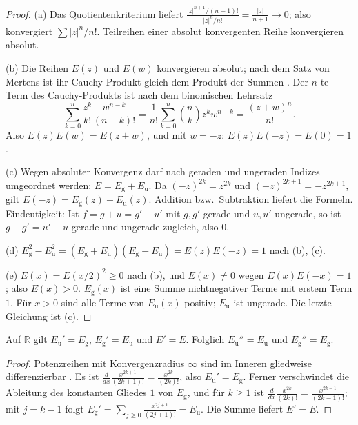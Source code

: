 \begin{proof}
(a) Das Quotientenkriterium liefert $\frac{|z|^{n+1}/(n+1)!}{|z|^n/n!}=\frac{|z|}{n+1}\to0$; also konvergiert $\sum|z|^n/n!$. Teilreihen einer absolut konvergenten Reihe konvergieren absolut.

(b) Die Reihen $E(z)$ und $E(w)$ konvergieren absolut; nach dem Satz von Mertens ist ihr Cauchy-Produkt gleich dem Produkt der Summen \cite{rudin_analysis}. Der $n$-te Term des Cauchy-Produkts ist nach dem binomischen Lehrsatz
\[
\sum_{k=0}^{n}\frac{z^k}{k!}\frac{w^{n-k}}{(n-k)!}=\frac1{n!}\sum_{k=0}^n\binom nk z^kw^{n-k}=\frac{(z+w)^n}{n!}.
\]
Also $E(z)E(w)=E(z+w)$, und mit $w=-z$: $E(z)E(-z)=E(0)=1$.

(c) Wegen absoluter Konvergenz darf nach geraden und ungeraden Indizes umgeordnet werden: $E=E_{\mathrm g}+E_{\mathrm u}$. Da $(-z)^{2k}=z^{2k}$ und $(-z)^{2k+1}=-z^{2k+1}$, gilt $E(-z)=E_{\mathrm g}(z)-E_{\mathrm u}(z)$. Addition bzw.\ Subtraktion liefert die Formeln. Eindeutigkeit: Ist $f=g+u=g'+u'$ mit $g,g'$ gerade und $u,u'$ ungerade, so ist $g-g'=u'-u$ gerade und ungerade zugleich, also $0$.

(d) $E_{\mathrm g}^2-E_{\mathrm u}^2=(E_{\mathrm g}+E_{\mathrm u})(E_{\mathrm g}-E_{\mathrm u})=E(z)E(-z)=1$ nach (b), (c).

(e) $E(x)=E(x/2)^2\ge0$ nach (b), und $E(x)\ne0$ wegen $E(x)E(-x)=1$; also $E(x)>0$. $E_{\mathrm g}(x)$ ist eine Summe nichtnegativer Terme mit erstem Term $1$. Für $x>0$ sind alle Terme von $E_{\mathrm u}(x)$ positiv; $E_{\mathrm u}$ ist ungerade. Die letzte Gleichung ist (c).
\end{proof}

\begin{lemma}\label{lem:ug:abl}
Auf $\mathbb{R}$ gilt $E_{\mathrm u}'=E_{\mathrm g}$, $E_{\mathrm g}'=E_{\mathrm u}$ und $E'=E$. Folglich $E_{\mathrm u}''=E_{\mathrm u}$ und $E_{\mathrm g}''=E_{\mathrm g}$.
\end{lemma}

\begin{proof}
Potenzreihen mit Konvergenzradius $\infty$ sind im Inneren gliedweise differenzierbar \cite{rudin_analysis}. Es ist $\frac{d}{dx}\frac{x^{2k+1}}{(2k+1)!}=\frac{x^{2k}}{(2k)!}$, also $E_{\mathrm u}'=E_{\mathrm g}$. Ferner verschwindet die Ableitung des konstanten Gliedes $1$ von $E_{\mathrm g}$, und für $k\ge1$ ist $\frac{d}{dx}\frac{x^{2k}}{(2k)!}=\frac{x^{2k-1}}{(2k-1)!}$; mit $j=k-1$ folgt $E_{\mathrm g}'=\sum_{j\ge0}\frac{x^{2j+1}}{(2j+1)!}=E_{\mathrm u}$. Die Summe liefert $E'=E$.
\end{proof}

